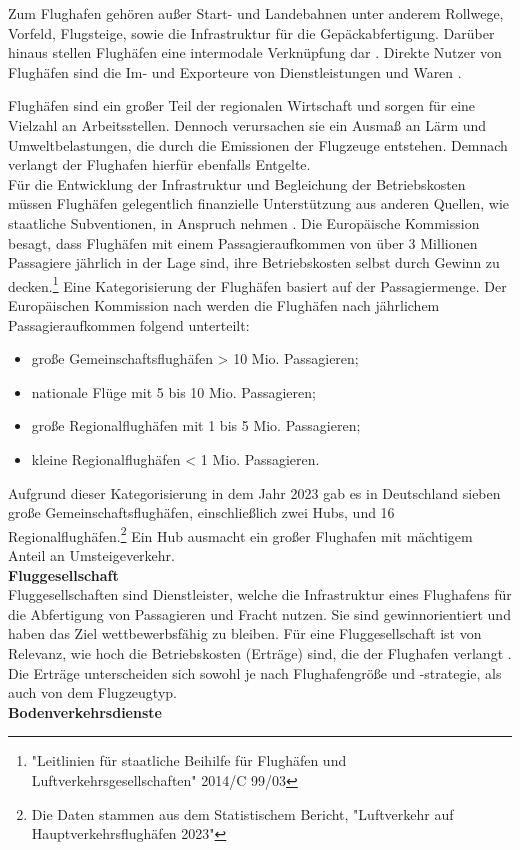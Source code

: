 Zum Flughafen gehören außer Start- und Landebahnen unter anderem Rollwege, Vorfeld, Flugsteige, sowie die Infrastruktur für die Gepäckabfertigung. 
%
Darüber hinaus stellen Flughäfen eine intermodale Verknüpfung dar \cite{conrady2019luftverkehr}. %
Direkte Nutzer von Flughäfen sind die Im- und Exporteure von Dienstleistungen und Waren \cite{schaar2010analysis}. 

Flughäfen sind ein großer Teil der regionalen Wirtschaft \cite{schaar2010analysis} und sorgen für eine Vielzahl an Arbeitsstellen. 
Dennoch verursachen sie ein Ausmaß an Lärm und Umweltbelastungen, die durch die Emissionen der Flugzeuge entstehen.
Demnach verlangt der Flughafen hierfür ebenfalls Entgelte.\\ %
%
Für die Entwicklung der Infrastruktur und Begleichung der Betriebskosten müssen Flughäfen gelegentlich finanzielle Unterstützung aus anderen
Quellen, wie staatliche Subventionen, in Anspruch nehmen \cite{schaar2010analysis}.
Die Europäische Kommission besagt, dass Flughäfen mit einem Passagieraufkommen von über 3 Millionen 
Passagiere jährlich in der Lage sind, ihre Betriebskosten selbst durch Gewinn zu decken.\footnote{"Leitlinien für staatliche Beihilfe für Flughäfen und Luftverkehrsgesellschaften" 2014/C 99/03}
Eine Kategorisierung der Flughäfen basiert auf der Passagiermenge. 
Der Europäischen Kommission nach werden die Flughäfen nach jährlichem Passagieraufkommen folgend unterteilt: 
\begin{itemize}
    \item große Gemeinschaftsflughäfen > 10 Mio. Passagieren;
    \item nationale Flüge mit 5 bis 10 Mio. Passagieren;
    \item große Regionalflughäfen mit 1 bis 5 Mio. Passagieren;
    \item kleine Regionalflughäfen < 1 Mio. Passagieren.
\end{itemize}
Aufgrund dieser Kategorisierung in dem Jahr 2023 gab es in Deutschland 
sieben große Gemeinschaftsflughäfen, einschließlich zwei Hubs, und 16 Regionalflughäfen.\footnote{Die Daten stammen aus dem Statistischem Bericht, "Luftverkehr auf Hauptverkehrsflughäfen 2023"}
Ein Hub ausmacht ein großer Flughafen mit mächtigem Anteil an Umsteigeverkehr.\\

\textbf{Fluggesellschaft} \\
Fluggesellschaften sind Dienstleister, welche die Infrastruktur eines Flughafens für die Abfertigung von Passagieren und Fracht nutzen. 
Sie sind gewinnorientiert und haben das Ziel wettbewerbsfähig zu bleiben. 
Für eine Fluggesellschaft ist von Relevanz, wie hoch die Betriebskosten (Erträge)
sind, die der Flughafen verlangt \cite{schaar2010analysis}. Die Erträge unterscheiden sich sowohl je nach Flughafengröße und -strategie,
als auch von dem Flugzeugtyp.\\
%
\textbf{Bodenverkehrsdienste} \\ %

